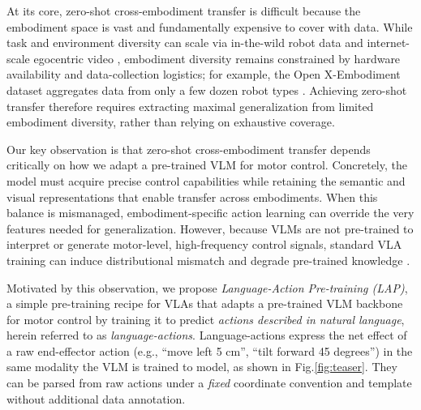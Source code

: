 At its core, zero-shot cross-embodiment transfer is difficult because the embodiment space is vast and fundamentally expensive to cover with data. While task and environment diversity can scale via in-the-wild robot data \cite{chi2024universalmanipulationinterfaceinthewild, khazatsky2025droidlargescaleinthewildrobot, tao2025dexwilddexteroushumaninteractions} and internet-scale egocentric video \cite{grauman2022ego4dworld3000hours, liu2024tacobenchmarkinggeneralizablebimanual, banerjee2025hot3dhandobjecttracking, wang2023holoassistegocentrichumaninteraction, hoque2025egodexlearningdexterousmanipulation, damen2020epickitchensdatasetcollectionchallenges}, embodiment diversity remains constrained by hardware availability and data-collection logistics; for example, the Open X-Embodiment dataset aggregates data from only a few dozen robot types \cite{embodimentcollaboration2025openxembodimentroboticlearning}. Achieving zero-shot transfer therefore requires extracting maximal generalization from limited embodiment diversity, rather than relying on exhaustive coverage.

Our key observation is that zero-shot cross-embodiment transfer depends critically on how we adapt a pre-trained VLM for motor control. Concretely, the model must acquire precise control capabilities while retaining the semantic and visual representations that enable transfer across embodiments. When this balance is mismanaged, embodiment-specific action learning can override the very features needed for generalization. However, because VLMs are not pre-trained to interpret or generate motor-level, high-frequency control signals, standard VLA training can induce distributional mismatch and degrade pre-trained knowledge \cite{hancock2025actionslanguagefinetuningvlms, zhou-etal-2025-chatvla, driess2025knowledgeinsulatingvisionlanguageactionmodels}.

Motivated by this observation, we propose \emph{Language-Action Pre-training (LAP)}, a simple pre-training recipe for VLAs that adapts a pre-trained VLM backbone for motor control by training it to predict \emph{actions described in natural language}, herein referred to as \emph{language-actions}. Language-actions express the net effect of a raw end-effector action (e.g., ``move left 5 cm'', ``tilt forward 45 degrees'') in the same modality the VLM is trained to model, as shown in Fig.\ref{fig:teaser}. They can be parsed from raw actions under a \emph{fixed} coordinate convention and template without additional data annotation. 

